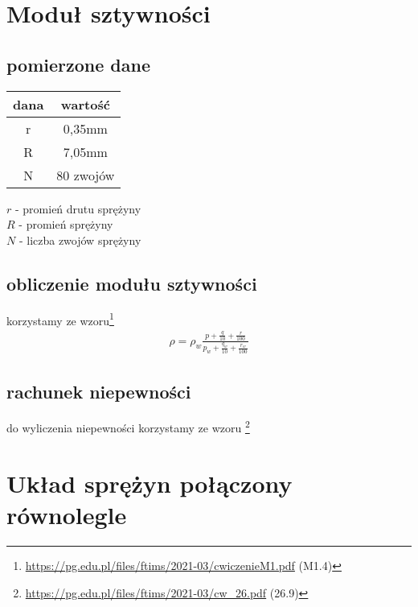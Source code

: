 \documentclass{article}
\begin{document}
\section{Moduł sztywności}
\subsection{pomierzone dane}
\begin{center}
\begin{tabular}{ c | c  }
dana & wartość\\
\hline
 r & 0,35mm \\
 R & 7,05mm \\ 
 N & 80 zwojów \\ 

\end{tabular}
\end{center}
$r$ - promień drutu sprężyny \\
$R$ - promień sprężyny \\
$N$ - liczba zwojów sprężyny

\subsection{obliczenie modułu sztywności}
korzystamy ze wzoru\footnote{\url{https://pg.edu.pl/files/ftims/2021-03/cwiczenieM1.pdf} (M1.4)}
\begin{gather*}
	\rho = \rho_w \frac{p+\frac{q}{10} + \frac{r}{100}}{p_w+\frac{q_w}{10} + \frac{r_w}{100}}
\end{gather*} 

\subsection{rachunek niepewności}
do wyliczenia niepewności korzystamy ze wzoru \footnote{\url{https://pg.edu.pl/files/ftims/2021-03/cw_26.pdf} (26.9)}

\section{Układ sprężyn połączony równolegle}
\end{document}
